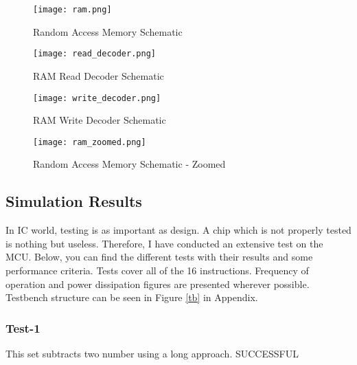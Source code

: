 \documentclass[12pt]{article}
\begin{document}
\begin{landscape}
\pagestyle{empty}
\begin{figure}[H]
\centering
\texttt{[image: ram.png]}
\caption{Random Access Memory Schematic}
\label{ram}
\end{figure}

\begin{figure}[H]
\centering
\texttt{[image: read\_decoder.png]}
\caption{RAM Read Decoder Schematic}
\label{read_dec_sch}
\end{figure}


\begin{figure}[H]
\centering
\texttt{[image: write\_decoder.png]}
\caption{RAM Write Decoder Schematic}
\label{write_dec_sch}
\end{figure}

\begin{figure}[H]
\centering
\texttt{[image: ram\_zoomed.png]}
\caption{Random Access Memory Schematic - Zoomed}
\label{ram_zoom}
\end{figure}

\end{landscape}











\newpage
\subsection*{Simulation Results}

In IC world, testing is as important as design. A chip which is not properly tested is nothing but useless. Therefore, I have conducted an extensive test on the MCU. Below, you can find the different tests with their results and some performance criteria. Tests cover all of the 16 instructions. Frequency of operation and power dissipation figures are presented wherever possible. Testbench structure can be seen in Figure \ref{tb} in Appendix.

\subsubsection*{Test-1} %
This set subtracts two number using a long approach. \color{Green} SUCCESSFUL \color{Black}
\end{document}
